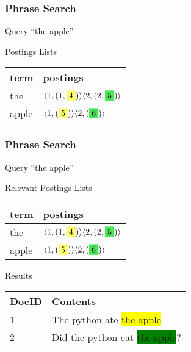 \documentclass{beamer}
\begin{document}
\begin{frame}
  \frametitle{Phrase Search}

  \begin{block}{Query}
    ``the apple''
  \end{block}

  \begin{block}{Postings Lists}
    \begin{tabular}{ l | l }
      term & postings \\ \hline
      the & $ \langle 1,(1,\colorbox{Yellow}{4}) \rangle \langle 2,(2,\colorbox{Green}{5}) \rangle $ \\
      apple & $ \langle 1,(\colorbox{Yellow}{5}) \rangle \langle 2,(\colorbox{Green}{6}) \rangle $ \\
    \end{tabular}
  \end{block}
\end{frame}

\begin{frame}
  \frametitle{Phrase Search}

  \begin{block}{Query}
    ``the apple''
  \end{block}

  \begin{block}{Relevant Postings Lists}
    \begin{tabular}{ l | l }
      term & postings \\ \hline
      the & $ \langle 1,(1,\colorbox{Yellow}{4}) \rangle \langle 2,(2,\colorbox{Green}{5}) \rangle $ \\
      apple & $ \langle 1,(\colorbox{Yellow}{5}) \rangle \langle 2,(\colorbox{Green}{6}) \rangle $ \\
    \end{tabular}
  \end{block}

  \begin{block}{Results}

    \begin{tabular}{ l | l }
      DocID & Contents \\ \hline
      1 & The python ate \colorbox{Yellow}{the apple} \\
      2 & Did the python eat \colorbox{Green}{the apple}? \\
    \end{tabular}

  \end{block}
\end{frame}
\end{document}

